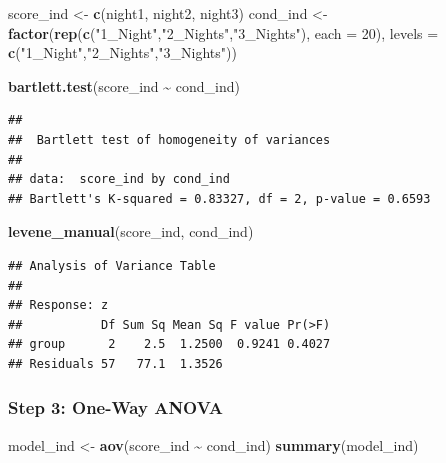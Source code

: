 \documentclass[
]{article}
\newenvironment{Shaded}{\begin{snugshade}}{\end{snugshade}}
\newcommand{\AttributeTok}[1]{\textcolor[rgb]{0.13,0.29,0.53}{#1}}
\newcommand{\DecValTok}[1]{\textcolor[rgb]{0.00,0.00,0.81}{#1}}
\newcommand{\FunctionTok}[1]{\textcolor[rgb]{0.13,0.29,0.53}{\textbf{#1}}}
\newcommand{\NormalTok}[1]{#1}
\newcommand{\OtherTok}[1]{\textcolor[rgb]{0.56,0.35,0.01}{#1}}
\newcommand{\SpecialCharTok}[1]{\textcolor[rgb]{0.81,0.36,0.00}{\textbf{#1}}}
\newcommand{\StringTok}[1]{\textcolor[rgb]{0.31,0.60,0.02}{#1}}
\begin{document}
\begin{Shaded}
\begin{Highlighting}[]
\NormalTok{score\_ind }\OtherTok{\textless{}{-}} \FunctionTok{c}\NormalTok{(night1, night2, night3)}
\NormalTok{cond\_ind  }\OtherTok{\textless{}{-}} \FunctionTok{factor}\NormalTok{(}\FunctionTok{rep}\NormalTok{(}\FunctionTok{c}\NormalTok{(}\StringTok{"1\_Night"}\NormalTok{,}\StringTok{"2\_Nights"}\NormalTok{,}\StringTok{"3\_Nights"}\NormalTok{), }\AttributeTok{each =} \DecValTok{20}\NormalTok{),}
                    \AttributeTok{levels =} \FunctionTok{c}\NormalTok{(}\StringTok{"1\_Night"}\NormalTok{,}\StringTok{"2\_Nights"}\NormalTok{,}\StringTok{"3\_Nights"}\NormalTok{))}

\FunctionTok{bartlett.test}\NormalTok{(score\_ind }\SpecialCharTok{\textasciitilde{}}\NormalTok{ cond\_ind)}
\end{Highlighting}
\end{Shaded}

\begin{verbatim}
## 
##  Bartlett test of homogeneity of variances
## 
## data:  score_ind by cond_ind
## Bartlett's K-squared = 0.83327, df = 2, p-value = 0.6593
\end{verbatim}

\begin{Shaded}
\begin{Highlighting}[]
\FunctionTok{levene\_manual}\NormalTok{(score\_ind, cond\_ind)}
\end{Highlighting}
\end{Shaded}

\begin{verbatim}
## Analysis of Variance Table
## 
## Response: z
##           Df Sum Sq Mean Sq F value Pr(>F)
## group      2    2.5  1.2500  0.9241 0.4027
## Residuals 57   77.1  1.3526
\end{verbatim}

\subsubsection{Step 3: One-Way ANOVA}\label{step-3-one-way-anova-1}

\begin{Shaded}
\begin{Highlighting}[]
\NormalTok{model\_ind }\OtherTok{\textless{}{-}} \FunctionTok{aov}\NormalTok{(score\_ind }\SpecialCharTok{\textasciitilde{}}\NormalTok{ cond\_ind)}
\FunctionTok{summary}\NormalTok{(model\_ind)}
\end{Highlighting}
\end{Shaded}
\end{document}

